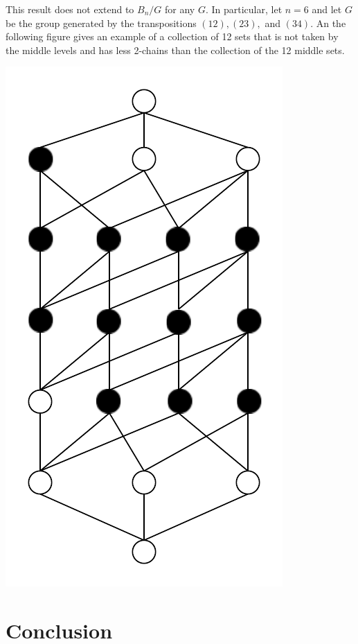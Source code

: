\documentclass[12pt]{article}
\theoremstyle{plain}
\theoremstyle{definition}
\theoremstyle{remark}
\begin{document}
This result does not extend to $B_n / G$ for any $G$. In particular, let $n = 6$ and let $G$ be the group generated by the transpositions $(12), (23),$ and $(34)$. An the following figure gives an example of a collection of 12 sets that is not taken by the middle levels and has less 2-chains than the collection of the 12 middle sets.
\begin{center}
\includegraphics[scale=0.7]{counterexamplegraph.pdf}
\end{center}

\section{Conclusion}

\end{document}
